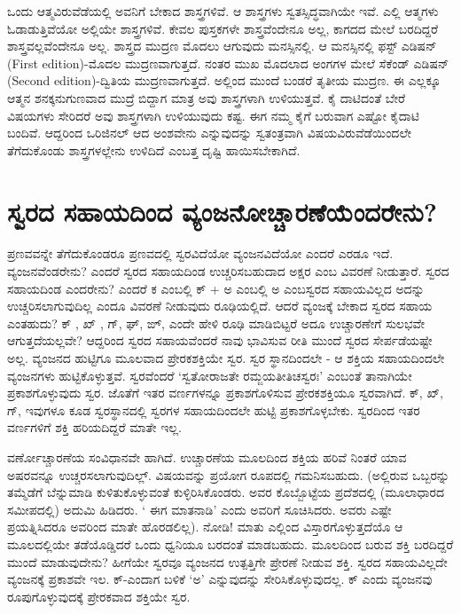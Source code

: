 ಒಂದು ಆತ್ಮವಿರುವೆಡೆಯಲ್ಲಿ ಅವನಿಗೆ ಬೇಕಾದ ಶಾಸ್ತ್ರಗಳಿವೆ. ಆ ಶಾಸ್ತ್ರಗಳು ಸ್ವತಸ್ಸಿದ್ಧವಾಗಿಯೇ ಇವೆ. ಎಲ್ಲಿ ಆತ್ಮಗಳು ಓಡಾಡುತ್ತಿವೆಯೋ ಅಲ್ಲಿಯೇ ಶಾಸ್ತ್ರಗಳಿವೆ. ಕೇವಲ ಪುಸ್ತಕಗಳೇ ಶಾಸ್ತ್ರವೆಂದೇನೂ ಅಲ್ಲ, ಕಾಗದದ ಮೇಲೆ ಬರದಿದ್ದರೆ ಶಾಸ್ತ್ರವಲ್ಲವೆಂದೇನೂ ಅಲ್ಲ. ಶಾಸ್ತ್ರದ ಮುದ್ರಣ ಮೊದಲು ಆಗುವುದು ಮನಸ್ಸಿನಲ್ಲಿ. ಆ ಮನಸ್ಸಿನಲ್ಲಿ ಫಸ್ಟ್  ಎಡಿಷನ್ {(\eng First edition)}-ಮೊದಲ ಮುದ್ರಣವಾಗುತ್ತದೆ. ನಂತರ ಮುಖ ಮೊದಲಾದ ಅಂಗಗಳ ಮೇಲೆ ಸೆಕೆಂಡ್ ಎಡಿಷನ್ {(\eng Second edition)}-ದ್ವಿತಿಯ ಮುದ್ರಣವಾಗುತ್ತದೆ. ಅಲ್ಲಿಂದ ಮುಂದೆ ಬಂಡರೆ ತೃತೀಯ ಮುದ್ರಣ. ಈ ಎಲ್ಲಕ್ಕೂ ಆತ್ಮನ ಶನಕ್ಕನುಗುಣವಾದ ಮುದ್ರೆ ಬಿದ್ದಾಗ ಮಾತ್ರ ಅವು ಶಾಸ್ತ್ರಗಳಾಗಿ ಉಳಿಯುತ್ತವೆ. ಕೈ ದಾಟಿದಂತೆ ಬೇರೆ ವಿಷಯಗಳು ಸೇರಿದರೆ ಅವು ಶಾಸ್ತ್ರಗಳಾಗಿ ಉಳಿಯುವುದು ಕಷ್ಟ. ಈಗ ನಮ್ಮ ಕೈಗೆ ಬರುವಾಗ ಎಷ್ಟೋ ಕೈದಾಟಿ ಬಂದಿವೆ. ಆದ್ದರಿಂದ ಒರಿಜಿನಲ್ ಆದ ಅಂಶವೇನು ಎನ್ನುವುದನ್ನು ಸ್ವತಂತ್ರವಾಗಿ ವಿಷಯವಿರುವೆಡೆಯಿಂದಲೇ ತೆಗೆದುಕೊಂಡು ಶಾಸ್ತ್ರಗಳಲ್ಲೇನು ಉಳಿದಿದೆ ಎಂಬತ್ತ ದೃಷ್ಟಿ ಹಾಯಿಸಬೇಕಾಗಿದೆ.

\section*{ಸ್ವರದ ಸಹಾಯದಿಂದ ವ್ಯಂಜನೋಚ್ಚಾರಣೆಯೆಂದರೇನು?}

ಪ್ರಣವವನ್ನೇ ತೆಗೆದುಕೊಂಡರೂ ಪ್ರಣವದಲ್ಲಿ ಸ್ವರವಿದೆಯೋ ವ್ಯಂಜನವಿದೆಯೋ ಎಂದರೆ ಎರಡೂ ಇದೆ. ವ್ಯಂಜನವೆಂಡರೇನು? ಎಂದರೆ ಸ್ವರದ ಸಹಾಯದಿಂಡ ಉಚ್ಚರಿಸಬಹುದಾದ ಅಕ್ಷರ ಎಂಬ ವಿವರಣೆ ನೀಡುತ್ತಾರೆ. ಸ್ವರದ ಸಹಾಯದಿಂಡ ಎಂದರೇನು? ಎಂದರೆ ಕ ಎಂಬಲ್ಲಿ ಕ್ + ಅ ಎಂಬಲ್ಲಿ ಅ ಎಂಬಸ್ವರದ ಸಹಾಯವಿಲ್ಲದ ಅದನ್ನು ಉಚ್ಚರಿಸಲಾಗುವುದಿಲ್ಲ ಎಂದೂ ವಿವರಣೆ ನೀಡುವುದು ರೂಢಿಯಲ್ಲಿದೆ. ಆದರೆ ವ್ಯಂಜಕ್ಕೆ  ಬೇಕಾದ ಸ್ವರದ ಸಹಾಯ ಎಂತಹುದು? ಕ್ , ಖ್ , ಗ್, ಘ್, ಙ್, ಎಂದೇ ಹೇಳಿ ರೂಢಿ ಮಾಡಿಬಿಟ್ಟರೆ ಅದೂ ಉಚ್ಚಾರಣೇಗೆ ಸುಲಭವೇ ಆಗುತ್ತದೆಯಲ್ಲವೇ? ಆದ್ದರಿಂದ ಸ್ವರದ ಸಹಾಯವೆಂದರೆ ನಾವು ಭಾವಿಸುವ ರೀತಿ ಮುಂದೆ ಸ್ವರದ ಸೇರ್ಪಡೆಯಷ್ಟೇ ಅಲ್ಲ. ವ್ಯಂಜನದ ಹುಟ್ಟಿಗೂ ಮೂಲವಾದ ಪ್ರೇರಕಶಕ್ತಿಯೇ ಸ್ವರ. ಸ್ವರ ಸ್ಥಾನದಿಂದಲೇ - ಆ ಶಕ್ತಿಯ ಸಹಾಯದಿಂದಲೇ ವ್ಯಂಜನಗಳು ಹುಟ್ಟಿಕೊಳ್ಳುತ್ತವೆ. ಸ್ವರವೆಂದರೆ `ಸ್ವತೋರಾಜತೇ ರಮ್ಜಯತೀತಿಚಸ್ವರಃ'\label{17a} ಎಂಬಂತೆ ತಾನಾಗಿಯೇ ಪ್ರಕಾಶಗೊಳ್ಳುವುದು ಸ್ವರ. ಜೊತೆಗೆ ಇತರ ವರ್ಣಗಳನ್ನೂ ಪ್ರಕಾಶಗೊಳಿಸುವ ಪ್ರೇರಕಶಕ್ತಿಯೂ ಸ್ವರವಾಗಿದೆ. ಕ್, ಖ್, ಗ್, ಇವುಗಳೂ ಕೂಡ ಸ್ವರಸ್ಥಾನದಲ್ಲಿ ಸ್ವರಗಳ ಸಹಾಯದಿಂದಲೇ ಹುಟ್ಟಿ ಪ್ರಕಾಶಗೊಳ್ಳಬೇಕು. ಸ್ವರದಿಂದ ಇತರ ವರ್ಣಗಳಿಗೆ ಶಕ್ತಿ ಹರಿಯದಿದ್ದರೆ ಮಾತೇ ಇಲ್ಲ.

ವರ್ಣೋಚ್ಚಾರಣೆಯ ಸಂವಿಧಾನವೇ ಹಾಗಿದೆ.  ಉಚ್ಚಾರಣೆಯ ಮೂಲದಿಂದ ಶಕ್ತಿಯ ಹರಿವೆ ನಿಂತರೆ ಯಾವ ಅಷರವನ್ನೂ ಉಚ್ಚರಸಲಾಗುವುದಿಲ್ಲ್. ವಿಷಯವನ್ನು ಪ್ರಯೋಗ ರೂಪದಲ್ಲಿ ಗಮನಿಸಬಹುದು. (ಅಲ್ಲಿರುವ ಒಬ್ಬರನ್ನು ತಮ್ಮೆಡೆಗೆ ಬೆನ್ನುಮಾಡಿ ಕುಳಿತುಕೊಳ್ಳುವಂತೆ ಕುಳ್ಳಿರಿಸಿಕೊಂಡರು. ಅವರ ಕೊಬ್ಬೊಟ್ಟೆಯ ಪ್ರದೆಶದಲ್ಲಿ (ಮೂಲಾಧಾರದ ಸಮೀಪದಲ್ಲಿ) ಅದುಮಿ ಹಿಡಿದರು. ` ಈಗ ಮಾತನಾಡಿ' ಎಂದು ಅವರಿಗೆ ಸೂಚಿಸಿದರು. ಅವರು ಎಷ್ಟೇ ಪ್ರಯತ್ನಿಸಿದರೂ ಅವರಿಂದ ಮಾತೇ ಹೊರಡಲಿಲ್ಲ).  ನೋಡಿ! ಮಾತು ಎಲ್ಲಿಂದ ವಿಸ್ತಾರಗೊಳ್ಳುತ್ತದೆಯೊ ಆ ಮೂಲದಲ್ಲಿಯೇ ತಡೆಯೊಡ್ಡಿದರೆ ಒಂದು ಧ್ವನಿಯೂ ಬರದಂತೆ ಮಾಡಬಹುದು. ಮೂಲದಿಂದ ಬರುವ ಶಕ್ತಿ ಬರದಿದ್ದರೆ ಮುಂದೆ ಮಾಡುವುದೇನು? ಹೀಗೆಯೇ ಸ್ವರವೂ ವ್ಯಂಜನದ ಉತ್ಪತ್ತಿಗೇ ಪ್ರೇರಣೆ ನೀಡುವ ಶಕ್ತಿ. ಸ್ವರದ ಸಹಾಯವಿಲ್ಲದೇ ವ್ಯಂಜನಕ್ಕೆ  ಪ್ರಕಾಶವೇ ಇಲ. ಕ್-ಎಂದಾಗ ಬಳಿಕೆ `ಅ' ಎನ್ನುವುದನ್ನು ಸೇರಿಸಿಕೊಳ್ಳುವುದಲ್ಲ. ಕ್ ಎಂದು ವ್ಯಂಜನವು ರೂಪುಗೊಳ್ಳುವುದಕ್ಕೆ  ಪ್ರೇರಕವಾದ ಶಕ್ತಿಯೇ ಸ್ವರ.

